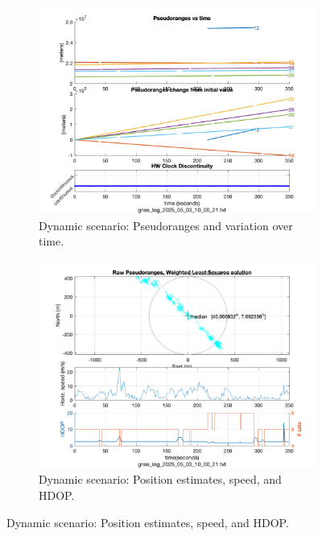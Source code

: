         \begin{figure}[h!]
            \centering
            \begin{subfigure}{0.23\textwidth}
                \centering
                \includegraphics[width=\textwidth]{images/Tram_15_trip_Castello_to_Pescatore/filtered/Samsung_A51_Tram_15_trip_Castello_to_Pescatore_fig1.png}
                \caption{Dynamic scenario: Pseudoranges and variation over time.}
                \label{fig:dynamic_pr}
            \end{subfigure}
            \hfill
            \begin{subfigure}{0.23\textwidth}
                \centering
                \includegraphics[width=\textwidth]{images/Tram_15_trip_Castello_to_Pescatore/filtered/Samsung_A51_Tram_15_trip_Castello_to_Pescatore_fig4.png}
                \caption{Dynamic scenario: Position estimates, speed, and HDOP.}
                \label{fig:dynamic_pos}
            \end{subfigure}
            \vspace{0.35cm}
            \label{fig:gnss_comparison}
          \end{figure}

